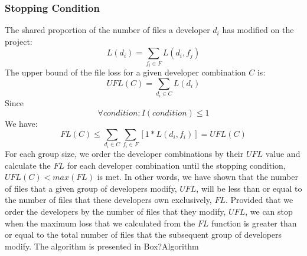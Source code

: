 \documentclass[11pt, a4paper, openright]{report}
\begin{document}
\subsubsection{Stopping Condition}
The shared proportion of the number of files a developer $d_i$ has modified on the project:
\begin{equation} L(d_i) = \sum_{f_i \in F} L(d_{i},f_{j}) \end{equation}
The upper bound of the file loss for a given developer combination $C$ is:
\begin{equation} UFL(C) = \sum_{d_i \in C}L(d_i) \end{equation}
Since \[\forall condition: I(condition) \leq 1 \]
We have:
\begin{equation} FL(C) \leq \sum_{d_i \in C} \sum_{f_i \in F} [1 * L(d_i,f_i)] = UFL(C)\end{equation}
For each group size, we order the developer combinations by their $UFL$ value and calculate the $FL$ for each developer combination until the stopping condition, $UFL(C)<max(FL)$ is met.
In other words, we have shown that the number of files that a given group of developers modify, $UFL$, will be less than or equal to the number of files that these developers own exclusively, $FL$. Provided that we order the developers by the number of files that they modify, $UFL$, we can stop when the maximum loss that we calculated from the $FL$ function is greater than or equal to the total number of files that the subsequent group of developers modify. The algorithm is presented in Box?Algorithm
\end{document}
